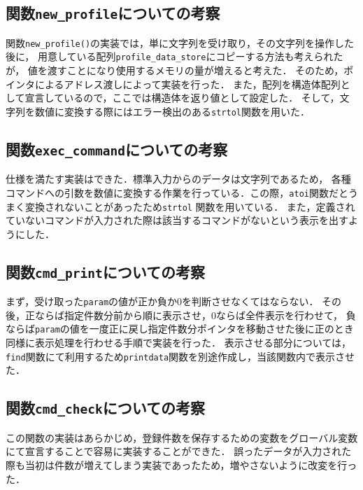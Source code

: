 \documentclass[a4j,11pt]{jarticle}
\begin{document}
\subsection{関数\texttt{new\_profile}についての考察}
関数\verb|new_profile()|の実装では，単に文字列を受け取り，その文字列を操作した後に，
用意している配列\verb|profile_data_store|にコピーする方法も考えられたが，
値を渡すことになり使用するメモリの量が増えると考えた．
そのため，ポインタによるアドレス渡しによって実装を行った．
また，配列を構造体配列として宣言しているので，ここでは構造体を返り値として設定した．
そして，文字列を数値に変換する際にはエラー検出のある\verb|strtol|関数を用いた．
\subsection{関数\texttt{exec\_command}についての考察}
仕様を満たす実装はできた．標準入力からのデータは文字列であるため，
各種コマンドへの引数を数値に変換する作業を行っている．この際，\verb|atoi|関数だとうまく変換されないことがあったため\verb|strtol|
関数を用いている．
また，定義されていないコマンドが入力された際は該当するコマンドがないという表示を出すようにした．

\subsection{関数\texttt{cmd\_print}についての考察}
まず，受け取った\verb|param|の値が正か負か$0$を判断させなくてはならない．
その後，正ならば指定件数分前から順に表示させ，$0$ならば全件表示を行わせて，
負ならば\verb|param|の値を一度正に戻し指定件数分ポインタを移動させた後に正のとき同様に表示処理を行わせる手順で実装を行った．
表示させる部分については，\verb|find|関数にて利用するため\verb|printdata|関数を別途作成し，当該関数内で表示させた．
\subsection{関数\texttt{cmd\_check}についての考察}
この関数の実装はあらかじめ，登録件数を保存するための変数をグローバル変数にて宣言することで容易に実装することができた．
誤ったデータが入力された際も当初は件数が増えてしまう実装であったため，増やさないように改変を行った．
\end{document}
